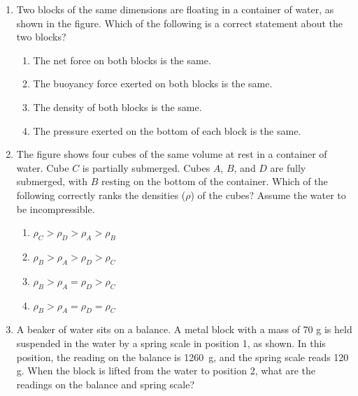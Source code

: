 \documentclass{../../../oss-apphys}
\begin{document}
\begin{multicols}{2}
\begin{enumerate}[leftmargin=18pt,start=3]
  \item Two blocks of the same dimensions are floating in a container of water,
    as shown in the figure. Which of the following is a correct statement about
    the two blocks?
    \begin{center}
      \vspace{-.15in}
    \end{center}
    \begin{enumerate}[noitemsep,topsep=0pt,leftmargin=18pt,label=(\Alph*)]
    \item The net force on both blocks is the same.
    \item The buoyancy force exerted on both blocks is the same.
    \item The density of both blocks is the same.
    \item The pressure exerted on the bottom of each block is the same.
    \end{enumerate}
    \columnbreak
    
  \item The figure shows four cubes of the same volume at rest in a container
    of water. Cube $C$ is partially submerged. Cubes $A$, $B$, and $D$ are fully
    submerged, with $B$ resting on the bottom of the container. Which of the
    following correctly ranks the densities ($\rho$) of the cubes? Assume the
    water to be incompressible.
    \begin{center}
      \vspace{-.15in}
    \end{center}
    \begin{enumerate}[noitemsep,topsep=0pt,leftmargin=18pt,label=(\Alph*)]
    \item $\rho_C >\rho_D >\rho_A >\rho_B$
    \item $\rho_B >\rho_A >\rho_D >\rho_C$
    \item $\rho_B >\rho_A =\rho_D >\rho_C$
    \item $\rho_B >\rho_A =\rho_D =\rho_C$
    \end{enumerate}

  \item A beaker of water sits on a balance. A metal block with a mass of
    70 g is held suspended in the water by a spring scale in position 1, as
    shown. In this position, the reading on the balance is
    \SI{1260}{\gram}, and the spring scale reads 120 g. When the block is
    lifted from the water to position 2, what are the readings on the balance
    and spring scale?
    \begin{center}
      \vspace{-.15in}


\end{center}
\end{enumerate}
\end{multicols}
\end{document}
